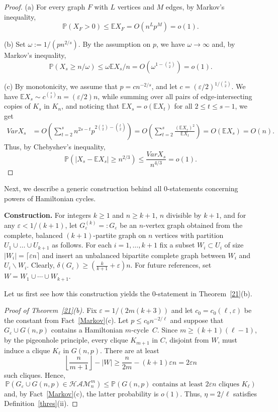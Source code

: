 \documentclass[reqno, 12pt]{amsart}
\numberwithin{equation}{section}
\numberwithin{figure}{section}
\let\setminus=\smallsetminus
\let\epsilon=\varepsilon
\let\eps=\epsilon
\def\EE{{\mathds E}}
\let\E=\EE
\def\PP{{\mathds P}}
\let\Prob=\PP
\newcommand{\ham}{\mathcal{HAM}}
\theoremstyle{plain}
\theoremstyle{definition}
\begin{document}
\begin{proof}
(a) For every graph $F$ with $L$ vertices and $M$ edges, by Markov's inequality,
\[\Prob(X_F>0)\le \E X_F=O(n^Lp^M)=o(1).\]

(b) Set $\omega:=1/(pn^{2/s})$. By the assumption on $p$, we have $\omega\to\infty$ and, by Markov's inequality,
$$\Prob(X_s\ge n/\omega)\le \omega\E X_s/n=O\left(\omega^{1-\binom s2}\right)=o(1).$$

(c) By monotonicity, we assume that $p = cn^{-2/s}$, and let $c=(\eps/2)^{1/\binom s2}$. We have $\E X_s\sim c^{\binom s2}n=(\eps/2)n$, while summing over all pairs of edge-intersecting copies of $K_s$ in $K_n$, and noticing that $\E X_s=o(\E X_t)$ for all $2\le t\le s-1$, we get
\begin{align*}
    Var X_s & =O\left(\sum_{t=2}^sn^{2s-t}p^{2\binom s2-\binom t2}\right) = O\left(\sum_{t=2}^s\frac{(\E X_s)^2}{\E X_t}\right)  =O\left(\E X_s\right) =O(n).
\end{align*}
Thus, by Chebyshev's inequality,
$$\Prob\left(|X_s-\E X_s|\ge n^{2/3}\right)\le\frac{Var X_s}{n^{4/3}}=o(1).$$
\end{proof}


Next, we describe a generic construction behind all 0-statements concerning powers of Hamiltonian cycles.
\smallskip

{\bf Construction.} For integers $k\ge1$ and $n\ge k+1$, $n$ divisible by $k+1$, and for any $\eps<1/(k+1)$,
let $G^{(k)}_\varepsilon=:G_\varepsilon$ be an $n$-vertex graph obtained from the complete, balanced $(k+1)$-partite graph on $n$ vertices with partition $U_1\cup\dots\cup U_{k+1}$ as follows. For each $i=1,\dots,k+1$  fix a subset $W_i\subset U_i$ of size $|W_i|=\lceil\eps n\rceil$ and insert
an unbalanced bipartite complete graph between $W_i$ and $U_i\setminus W_i$.  Clearly, $\delta(G_\varepsilon) \geq \left(\frac{k}{k+1}+\varepsilon\right)n$. For future references, set $W=W_1\cup \cdots\cup W_{k+1}$.

\smallskip

Let us first see how this construction yields the 0-statement in Theorem~\ref{21}(b).

\begin{proof}[Proof of Theorem~\ref{21}(b)] Fix $\eps=1/(2m(k+3))$ and let $c_0=c_0(\ell,\epsilon)$ be the constant from Fact~\ref{Markov}(c).
Let $p\le c_0n^{-2/\ell}$ and suppose that $G_\eps\cup G(n,p)$ contains a Hamiltonian $m$-cycle~$C$. Since $m\ge(k+1)(\ell-1)$, by the pigeonhole principle, every clique $K_{m+1}$ in $C$, disjoint from $W$, must induce a clique $K_\ell$ in $G(n,p)$. There are at least
$$\left\lfloor\frac n{m+1}\right\rfloor-|W|\ge\frac n{2m}-(k+1)\eps n=2\eps n$$
 such cliques. Hence,
$$\Prob(G_\eps\cup G(n,p)\in\ham^m_n)\le\Prob(G(n,p)\;\mbox{contains at least $2\eps n$ cliques $K_\ell$})$$
and, by Fact~\ref{Markov}(c), the latter probability is $o(1)$. Thus, $\eta=2/\ell$ satisfies Definition~\ref{thres}(ii).
\end{proof}
\end{document}
